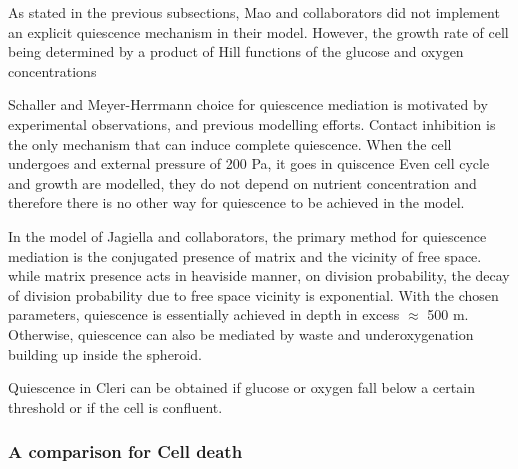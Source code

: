 \documentclass[11pt,a4paper]{article}
\begin{document}
As stated in the previous subsections, Mao and collaborators did not implement an explicit quiescence mechanism in their model. However, the growth rate of cell being determined by a product of Hill functions of the glucose  and oxygen concentrations

Schaller and Meyer-Herrmann choice for quiescence mediation is motivated by experimental observations,\cite{Aplin1999}\cite{Helmlinger1997} and previous modelling efforts. \cite{Galle2005} Contact inhibition is the only mechanism that can induce complete quiescence. When the cell undergoes and external  pressure of 200 Pa, it goes in quiscence Even cell cycle and growth are modelled, they do not depend on nutrient concentration and therefore there is no other way for quiescence to be achieved in the model.\cite{Kempf2005}\cite{Kempf2015}

In the model of Jagiella and collaborators, the primary method for quiescence mediation is the conjugated presence of matrix and the vicinity of free space. while matrix presence acts in heaviside manner, on division probability, the decay of division probability due to free space vicinity is exponential. With the chosen parameters, quiescence is essentially achieved in depth in excess $\approx$ 500 \textmu m. Otherwise, quiescence can also be mediated by waste and underoxygenation building up inside the spheroid. 


Quiescence in Cleri can be obtained if glucose or oxygen fall below a certain threshold or if the cell is confluent.

\subsubsection{A comparison for Cell death}



\end{document}
